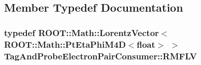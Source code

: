 \subsection{Member Typedef Documentation}
\hypertarget{classTagAndProbeElectronPairConsumer_a4b9ec909b608de08bdca151d4ef6ba45}{
\subsubsection[{RMFLV}]{\setlength{\rightskip}{0pt plus 5cm}typedef ROOT::Math::LorentzVector$<$ROOT::Math::PtEtaPhiM4D$<$float$>$ $>$ {\bf TagAndProbeElectronPairConsumer::RMFLV}}}
\label{classTagAndProbeElectronPairConsumer_a4b9ec909b608de08bdca151d4ef6ba45}


